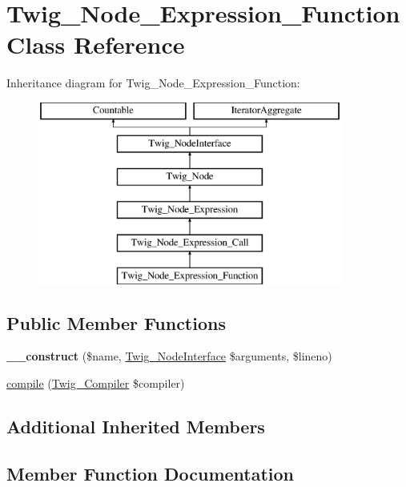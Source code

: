 \hypertarget{classTwig__Node__Expression__Function}{}\section{Twig\+\_\+\+Node\+\_\+\+Expression\+\_\+\+Function Class Reference}
\label{classTwig__Node__Expression__Function}
Inheritance diagram for Twig\+\_\+\+Node\+\_\+\+Expression\+\_\+\+Function\+:\begin{figure}[H]
\begin{center}
\leavevmode
\includegraphics[height=6.000000cm]{classTwig__Node__Expression__Function}
\end{center}
\end{figure}
\subsection*{Public Member Functions}
\begin{DoxyCompactItemize}
\item 
{\bfseries \+\_\+\+\_\+construct} (\$name, \hyperlink{interfaceTwig__NodeInterface}{Twig\+\_\+\+Node\+Interface} \$arguments, \$lineno)\hypertarget{classTwig__Node__Expression__Function_a52d8d022cb5a0aac8288420d667254d9}{}\label{classTwig__Node__Expression__Function_a52d8d022cb5a0aac8288420d667254d9}

\item 
\hyperlink{classTwig__Node__Expression__Function_affba9347f7efe22ae3e0aea16cb0ea4e}{compile} (\hyperlink{classTwig__Compiler}{Twig\+\_\+\+Compiler} \$compiler)
\end{DoxyCompactItemize}
\subsection*{Additional Inherited Members}


\subsection{Member Function Documentation}
